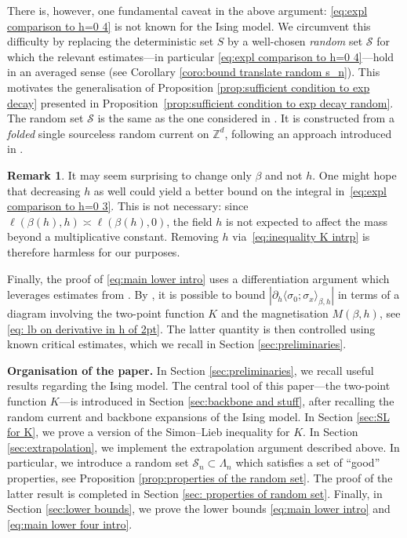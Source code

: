 \documentclass[11pt,a4paper]{article}
\numberwithin{equation}{section}
\theoremstyle{plain}
\theoremstyle{definition}
\newtheorem{Rem}[Thm]{Remark}
\begin{document}
There is, however, one fundamental caveat in the above argument: \eqref{eq:expl comparison to h=0 4} is not known for the Ising model.
We circumvent 
this difficulty by replacing the deterministic set $S$ by a well-chosen \emph{random} set 
$\mathcal{S}$ for which the relevant estimates---in particular \eqref{eq:expl comparison to h=0 4}---hold in an 
averaged sense (see Corollary \ref{coro:bound translate random s_n}). This motivates the generalisation of Proposition \ref{prop:sufficient condition to exp decay} presented in 
Proposition~\ref{prop:sufficient condition to exp decay random}. The 
random set $\mathcal{S}$ is the same as the one considered in \cite{DuminilPanis2024newLB}. It is constructed from a \emph{folded} single 
sourceless random current on $\mathbb{Z}^d$, following an approach 
introduced in \cite{AizenmanDuminilTassionWarzelEmergentPlanarity2019}.

\begin{Rem}
It may seem surprising to change only $\beta$ and not $h$. One might hope 
that decreasing $h$ as well could yield a better bound on the integral 
in~\eqref{eq:expl comparison to h=0 3}. This is not necessary: since 
$\ell(\beta(h),h)\asymp\ell(\beta(h),0)$, the field $h$ is not expected 
to affect the mass beyond a multiplicative constant. Removing $h$ 
via~\eqref{eq:inequality K intrp} is therefore harmless for our purposes.
\end{Rem}
 

Finally, the proof of \eqref{eq:main lower intro} uses a differentiation argument which leverages estimates from \cite{AizenmanFernandezCriticalBehaviorMagnetization1986,DuminilPanis2024newLB}. By \cite{AizenmanFernandezCriticalBehaviorMagnetization1986}, it is possible to bound $|\partial_h\langle \sigma_0;\sigma_x\rangle_{\beta,h}|$ in terms of a diagram involving the two-point function $K$ and the magnetisation $M(\beta,h)$, see \eqref{eq: lb on derivative in h of 2pt}. The latter quantity is then controlled using known critical estimates, which we recall in Section \ref{sec:preliminaries}. 

\hfill
 

\noindent\textbf{Organisation of the paper.} In Section \ref{sec:preliminaries}, we recall useful results regarding the Ising model. The central tool of this paper---the two-point function $K$---is introduced in Section \ref{sec:backbone and stuff}, after recalling the random current and backbone expansions of the Ising model. In Section \ref{sec:SL for K}, we prove a version of the Simon--Lieb inequality for $K$. In Section \ref{sec:extrapolation}, we implement the extrapolation argument described above. In particular, we introduce a random set $\mathcal S_n\subset \Lambda_n$ which satisfies a set of ``good'' properties, see Proposition \ref{prop:properties of the random set}. The proof of the latter result is completed in Section \ref{sec: properties of random set}. Finally, in Section \ref{sec:lower bounds}, we prove the lower bounds \eqref{eq:main lower intro} and \eqref{eq:main lower four intro}.
\end{document}
